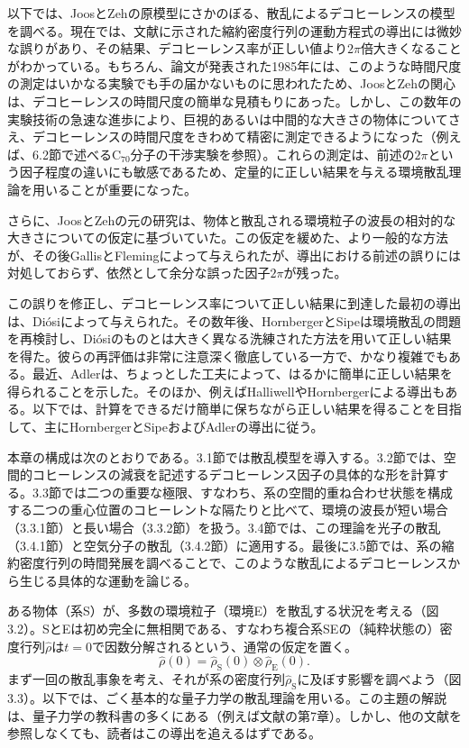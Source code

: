 以下では、JoosとZehの原模型\cite{ref007}にさかのぼる、散乱によるデコヒーレンスの模型を調べる。現在では、文献\cite{ref007}に示された縮約密度行列の運動方程式の導出には微妙な誤りがあり、その結果、デコヒーレンス率が正しい値より$2\pi$倍大きくなることがわかっている\cite{ref159,ref160,ref161}。もちろん、論文が発表された1985年には、このような時間尺度の測定はいかなる実験でも手の届かないものに思われたため、JoosとZehの関心は、デコヒーレンスの時間尺度の簡単な見積もりにあった。しかし、この数年の実験技術の急速な進歩により、巨視的あるいは中間的な大きさの物体についてさえ、デコヒーレンスの時間尺度をきわめて精密に測定できるようになった（例えば、6.2節で述べるC$_{70}$分子の干渉実験を参照）。これらの測定は、前述の$2\pi$という因子程度の違いにも敏感であるため、定量的に正しい結果を与える環境散乱理論を用いることが重要になった。

さらに、JoosとZehの元の研究は、物体と散乱される環境粒子の波長の相対的な大きさについての仮定に基づいていた。この仮定を緩めた、より一般的な方法が、その後GallisとFleming\cite{ref162}によって与えられたが、導出における前述の誤りには対処しておらず、依然として余分な誤った因子$2\pi$が残った。

\hypertarget{srcpage:119}{}\label{srcpage:119}
この誤りを修正し、デコヒーレンス率について正しい結果に到達した最初の導出は、Diósi\cite{ref159}によって与えられた。その数年後、HornbergerとSipe\cite{ref160}は環境散乱の問題を再検討し、Diósiのものとは大きく異なる洗練された方法を用いて正しい結果を得た。彼らの再評価は非常に注意深く徹底している一方で、かなり複雑でもある。最近、Adler\cite{ref161}は、ちょっとした工夫によって、はるかに簡単に正しい結果を得られることを示した。そのほか、例えばHalliwell\cite{ref163}やHornberger\cite{ref164,ref165}による導出もある。以下では、計算をできるだけ簡単に保ちながら正しい結果を得ることを目指して、主にHornbergerとSipe\cite{ref160}およびAdler\cite{ref161}の導出に従う。

本章の構成は次のとおりである。3.1節では散乱模型を導入する。3.2節では、空間的コヒーレンスの減衰を記述するデコヒーレンス因子の具体的な形を計算する。3.3節では二つの重要な極限、すなわち、系の空間的重ね合わせ状態を構成する二つの重心位置のコヒーレントな隔たりと比べて、環境の波長が短い場合（3.3.1節）と長い場合（3.3.2節）を扱う。3.4節では、この理論を光子の散乱（3.4.1節）と空気分子の散乱（3.4.2節）に適用する。最後に3.5節では、系の縮約密度行列の時間発展を調べることで、このような散乱によるデコヒーレンスから生じる具体的な運動を論じる。

ある物体（系S）が、多数の環境粒子（環境E）を散乱する状況を考える（図3.2）。SとEは初め完全に無相関である、すなわち複合系SEの（純粋状態の）密度行列$\hat\rho$は$t=0$で因数分解されるという、通常の仮定を置く。
\begin{equation}
\hat\rho(0)=\hat\rho_{\mathrm S}(0)\otimes\hat\rho_{\mathrm E}(0).
\tag{3.4}
\end{equation}
まず一回の散乱事象を考え、それが系の密度行列$\hat\rho_{\mathrm S}$に及ぼす影響を調べよう（図3.3）。以下では、ごく基本的な量子力学の散乱理論を用いる。この主題の解説は、量子力学の教科書の多くにある（例えば文献\cite{ref058}の第7章）。しかし、他の文献を参照しなくても、読者はこの導出を追えるはずである。

